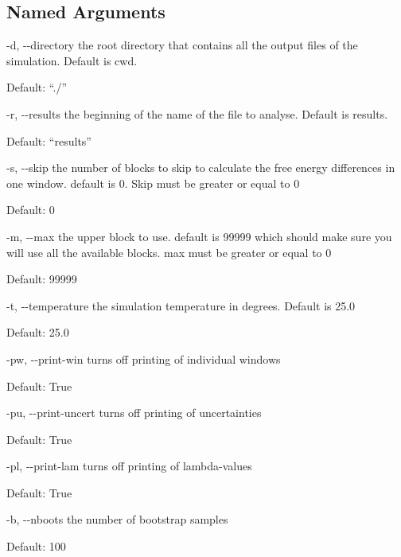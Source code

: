 \documentclass[letterpaper,10pt,english]{sphinxmanual}
\begin{document}
\subsection{Named Arguments}
\label{\detokenize{tools:Named Arguments}}\begin{optionlist}{3cm}
\item [-d, -{-}directory]  
the root directory that contains all the output files of the simulation. Default is cwd.

Default: “./”
\item [-r, -{-}results]  
the beginning of the name of the file to analyse. Default is results.

Default: “results”
\item [-s, -{-}skip]  
the number of blocks to skip to calculate the free energy differences in one window. default is 0. Skip must be greater or equal to 0

Default: 0
\item [-m, -{-}max]  
the upper block to use. default is 99999 which should make sure you will use all the available blocks. max must be greater or equal to 0

Default: 99999
\item [-t, -{-}temperature]  
the simulation temperature in degrees. Default is 25.0

Default: 25.0
\item [-pw, -{-}print-win]  
turns off printing of individual windows

Default: True
\item [-pu, -{-}print-uncert]  
turns off printing of uncertainties

Default: True
\item [-pl, -{-}print-lam]  
turns off printing of lambda-values

Default: True
\item [-b, -{-}nboots]  
the number of bootstrap samples

Default: 100
\end{optionlist}


%
\begin{sphinxVerbatim}[commandchars=\\\{\}]
  
  
  
   
\end{sphinxVerbatim}
\end{document}
